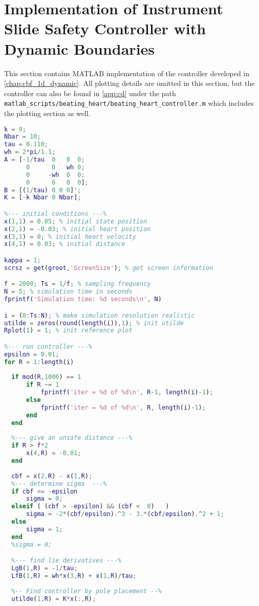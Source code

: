 \section{Implementation of Instrument Slide Safety Controller with Dynamic Boundaries}\label{sec:app:dynamic}
This section contains MATLAB implementation of the controller developed in \autoref{chap:cbf_1d_dynamic}. All plotting details are omitted in this section, but the controller can also be found in \autoref{app:cd} under the path \texttt{matlab\_scripts/beating\_heart/beating\_heart\_controller.m} which includes the plotting section as well.\\

\begin{lstlisting}[language=matlab]
%--- setup systems ---%
k = 9;
Nbar = 10;
tau = 0.110;
wh = 2*pi/1.1;
A = [-1/tau  0   0  0;
      0      0   wh 0;
      0     -wh  0  0;
      0      0   0  0];
B = [(1/tau) 0 0 0]';
K = [-k Nbar 0 Nbar];

%--- initial conditions ---%
x(1,1) = 0.05; % initial state position
x(2,1) = -0.03; % initial heart position
x(3,1) = 0; % initial heart velocity
x(4,1) = 0.03; % initial distance

kappa = 1;
scrsz = get(groot,'ScreenSize'); % get screen information

f = 2000; Ts = 1/f; % sampling frequency
N = 5; % simulation time in seconds
fprintf('Simulation time: %d seconds\n', N)

i = (0:Ts:N); % make simulation resolution realistic
utilde = zeros(round(length(i)),1); % init utilde
Rplot(1) = 1; % init reference plot

%--- run controller ---%
epsilon = 0.01; 
for R = 1:length(i)
    
  if mod(R,1000) == 1 
      if R ~= 1
          fprintf('iter = %d of %d\n', R-1, length(i)-1);
      else
          fprintf('iter = %d of %d\n', R, length(i)-1);
      end
  end
  
  %--- give an unsafe distance ---%
  if R > f*2 
      x(4,R) = -0.01;
  end
  
  cbf = x(2,R) - x(1,R);
  %--- determine sigma  ---% 
  if cbf <= -epsilon
      sigma = 0;
  elseif ( (cbf > -epsilon) && (cbf <  0)   )
      sigma = -2*(cbf/epsilon).^3 - 3.*(cbf/epsilon).^2 + 1;
  else
      sigma = 1;
  end
  %sigma = 0;

  %--- find lie derivatives ---%
  LgB(1,R) = -1/tau;
  LfB(1,R) = wh*x(3,R) + x(1,R)/tau;
  
  %-- Find controller by pole placement --%
  utilde(1,R) = K*x(:,R);


\end{lstlisting}
